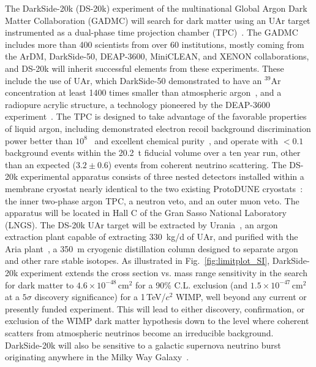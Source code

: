 The DarkSide-20k (DS-20k) experiment of the multinational Global Argon Dark Matter Collaboration (GADMC) will search for dark matter using an UAr target instrumented as a dual-phase time projection chamber (TPC)~\cite{Aalseth:2018gq}.  The GADMC includes more than 400 scientists from over 60 institutions, mostly coming from the ArDM, DarkSide-50, DEAP-3600, MiniCLEAN, and XENON collaborations, and DS-20k will inherit successful elements from these experiments. These include the use of UAr, which DarkSide-50 demonstrated to have an $^{39}$Ar concentration at least 1400 times smaller than atmospheric argon~\cite{Agnes:2015gu,Agnes:2016fz,Agnes:2018ep}, and a radiopure acrylic structure, a technology pioneered by the DEAP-3600 experiment~\cite{Nantais:2013jp,Amaudruz:2018gr}.  The TPC is designed to take advantage of the favorable properties of liquid argon, including demonstrated electron recoil background discrimination power better than $10^8$~\cite{Adhikari:2021} and excellent chemical purity~\cite{Ajaj:2019jx,Ajaj:2019jk}, and operate with $<0.1$ background events within the 20.2~t fiducial volume over a ten year run, other than an expected ($3.2 \pm 0.6$) events from coherent neutrino scattering.  The DS-20k experimental apparatus consists of three nested detectors installed within a membrane cryostat nearly identical to the two existing ProtoDUNE cryostats~\cite{Abi:2020gv,Abi:2020hj,Abi:2020je}: the inner two-phase argon TPC, a neutron veto, and an outer muon veto. The apparatus will be located in Hall C of the Gran Sasso National Laboratory (LNGS). The DS-20k UAr target will be extracted by Urania~\cite{Aalseth:2018gq}, an argon extraction plant capable of extracting 330~kg/d of UAr, and purified with the Aria plant~\cite{Agnes:2021us}, a 350~m cryogenic distillation column designed to separate argon and other rare stable isotopes.  As illustrated in Fig.~\ref{fig:limitplot_SI}, DarkSide-20k experiment extends the cross section vs. mass range sensitivity in the search for dark matter to  $4.6\times 10^{-48}$\,cm$^2$ for a 90\% C.L. exclusion (and $1.5\times 10^{-47}$\,cm$^2$ at a $5\sigma$ discovery significance) for a 1\,TeV/$c^2$ WIMP, well beyond any current or presently funded experiment.  This will lead to either discovery, confirmation, or exclusion of the WIMP dark matter hypothesis down to the level where coherent scatters from atmospheric neutrinos become an irreducible background.  DarkSide-20k will also be sensitive to a galactic supernova neutrino burst originating anywhere in the Milky Way Galaxy~\cite{Agnes:2021ke}.

